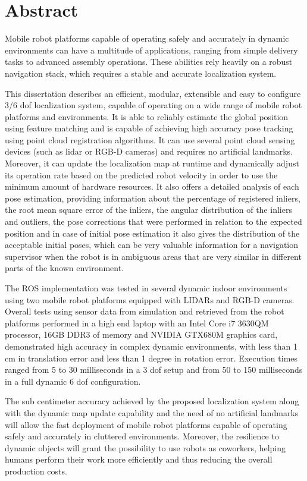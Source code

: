 \chapter*{Abstract}

Mobile robot platforms capable of operating safely and accurately in dynamic environments can have a multitude of applications, ranging from simple delivery tasks to advanced assembly operations. These abilities rely heavily on a robust navigation stack, which requires a stable and accurate localization system.

This dissertation describes an efficient, modular, extensible and easy to configure 3/6 \gls{dof} localization system, capable of operating on a wide range of mobile robot platforms and environments. It is able to reliably estimate the global position using feature matching and is capable of achieving high accuracy pose tracking using point cloud registration algorithms. It can use several point cloud sensing devices (such as \gls{lidar} or RGB-D cameras) and requires no artificial landmarks. Moreover, it can update the localization map at runtime and dynamically adjust its operation rate based on the predicted robot velocity in order to use the minimum amount of hardware resources. It also offers a detailed analysis of each pose estimation, providing information about the percentage of registered inliers, the root mean square error of the inliers, the angular distribution of the inliers and outliers, the pose corrections that were performed in relation to the expected position and in case of initial pose estimation it also gives the distribution of the acceptable initial poses, which can be very valuable information for a navigation supervisor when the robot is in ambiguous areas that are very similar in different parts of the known environment.

The ROS implementation was tested in several dynamic indoor environments using two mobile robot platforms equipped with LIDARs and RGB-D cameras. Overall tests using sensor data from simulation and retrieved from the robot platforms performed in a high end laptop with an Intel Core i7 3630QM processor, 16GB DDR3 of memory and NVIDIA GTX680M graphics card, demonstrated high accuracy in complex dynamic environments, with less than 1 cm in translation error and less than 1 degree in rotation error. Execution times ranged from 5 to 30 milliseconds in a 3 \gls{dof} setup and from 50 to 150 milliseconds in a full dynamic 6 \gls{dof} configuration.

The sub centimeter accuracy achieved by the proposed localization system along with the dynamic map update capability and the need of no artificial landmarks will allow the fast deployment of mobile robot platforms capable of operating safely and accurately in cluttered environments. Moreover, the resilience to dynamic objects will grant the possibility to use robots as coworkers, helping humans perform their work more efficiently and thus reducing the overall production costs.



